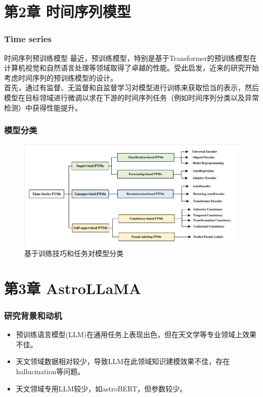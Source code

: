 \documentclass[10pt]{ctexbeamer}
\begin{document}
\section[Time Series Models]{ 第2章 时间序列模型}\label{sec:2}



\begin{frame}[t]
  \frametitle{Time series}
  \begin{block}{时间序列预训练模型}
    最近，预训练模型，特别是基于Transformer的预训练模型在计算机视觉和自然语言处理等领域取得了卓越的性能。受此启发，近来的研究开始考虑时间序列的预训练模型的设计。\\

    首先，通过有监督、无监督和自监督学习对模型进行训练来获取恰当的表示，然后模型在目标领域进行微调以求在下游的时间序列任务（例如时间序列分类以及异常检测）中获得性能提升。
  \end{block}
\end{frame}


\begin{frame}[t]
  \frametitle{模型分类}
  \begin{figure}
    \includegraphics[width=.8\textwidth, height=.8\textheight, keepaspectratio]{taxonomy.pdf}
    \caption{基于训练技巧和任务对模型分类}
  \end{figure}
\end{frame}

\section[AstroLLaMA]{ 第3章 AstroLLaMA}\label{sec:3}



\begin{frame}[t]
  \frametitle{研究背景和动机}
  \begin{itemize}
    \item 预训练语言模型(LLM)在通用任务上表现出色，但在天文学等专业领域上效果不佳。
    \item 天文领域数据相对较少，导致LLM在此领域知识建模效果不佳，存在hallucination等问题。
    \item 天文领域专用LLM较少，如astroBERT，但参数较少。
  \end{itemize}
\end{frame}
\end{document}
